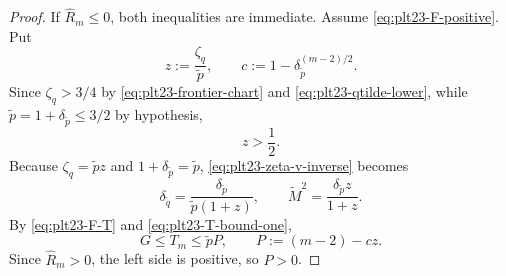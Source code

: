 ﻿\documentclass[11pt]{article}
\numberwithin{equation}{section}
\begin{document}
\begin{proof}
  If $\widehat R_m\le0$, both inequalities are immediate.
  Assume \eqref{eq:plt23-F-positive}.
  Put
  \[
    z:=\frac{\zeta_q}{\tilde p},
    \qquad
    c:=1-\delta_{\tilde p}^{(m-2)/2}.
  \]
  Since $\zeta_q>3/4$ by \eqref{eq:plt23-frontier-chart} and \eqref{eq:plt23-qtilde-lower}, while $\tilde p=1+\delta_{\tilde p}\le3/2$ by hypothesis,
  \[
    z>\frac12.
  \]
  Because $\zeta_q=\tilde pz$ and $1+\delta_{\tilde p}=\tilde p$, \eqref{eq:plt23-zeta-v-inverse} becomes
  \begin{equation}\label{eq:plt23-low-v-u-Mtilde}
    \delta_{\tilde q}=\frac{\delta_{\tilde p}}{\tilde p(1+z)},
    \qquad
    \tilde M^2=\frac{\delta_{\tilde p}z}{1+z}.
  \end{equation}
  By \eqref{eq:plt23-F-T} and \eqref{eq:plt23-T-bound-one},
  \begin{equation}\label{eq:plt23-G-low-v}
    G\le T_m\le\tilde pP,
    \qquad
    P:=(m-2)-cz.
  \end{equation}
  Since $\widehat R_m>0$, the left side is positive, so $P>0$.


\end{proof}
\end{document}
